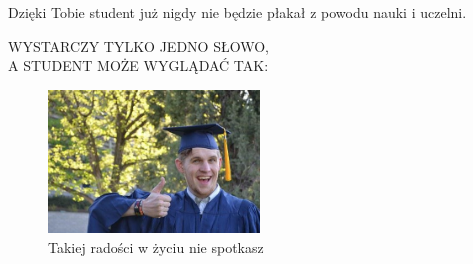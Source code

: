 \begin{flushleft}
\vspace {0.55cm}

Dzięki Tobie student już nigdy nie będzie płakał z powodu nauki i uczelni.

\vspace {0.50cm}
{{\Large WYSTARCZY TYLKO JEDNO SŁOWO,\\ 
        A STUDENT MOŻE WYGLĄDAĆ TAK:}}

\begin{figure}[htbp] 
    \centering
    \includegraphics[width=0.5\textwidth]{pictures/zadowolony-student.JPG} 
    \caption{Takiej radości w życiu nie spotkasz}
    \label{fig:radosc}
\end{figure}

\end{flushleft}